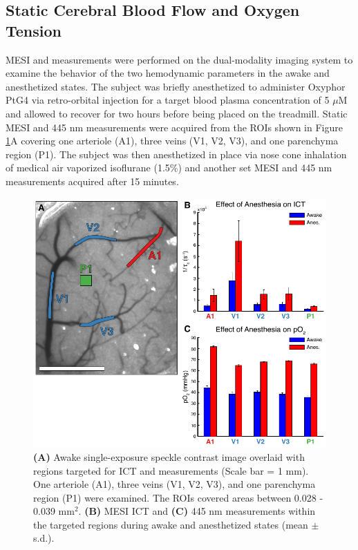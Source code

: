 \subsection{Static Cerebral Blood Flow and Oxygen Tension}

MESI and  measurements were performed on the dual-modality imaging system to examine the behavior of the two hemodynamic parameters in the awake and anesthetized states. The subject was briefly anesthetized to administer Oxyphor PtG4 via retro-orbital injection for a target blood plasma concentration of 5 $\mu$M and allowed to recover for two hours before being placed on the treadmill. Static MESI and 445 nm  measurements were acquired from the ROIs shown in Figure \ref{fig:specklepO2awakeanes}A covering one arteriole (A1), three veins (V1, V2, V3), and one parenchyma region (P1). The subject was then anesthetized in place via nose cone inhalation of medical air vaporized isoflurane (1.5\%) and another set MESI and 445 nm  measurements acquired after 15 minutes.

\begin{figure}
    \includegraphics{figures/chapter_5/specklepO2awakeanes.pdf}
    \caption{
        \label{fig:specklepO2awakeanes}
        \textbf{(A)} Awake single-exposure speckle contrast image overlaid with regions targeted for ICT and  measurements (Scale bar = 1 mm). One arteriole (A1), three veins (V1, V2, V3), and one parenchyma region (P1) were examined. The ROIs covered areas between 0.028 - 0.039 mm$^2$. \textbf{(B)} MESI ICT and \textbf{(C)} 445 nm  measurements within the targeted regions during awake and anesthetized states (mean $\pm$ s.d.).
    }
\end{figure}

